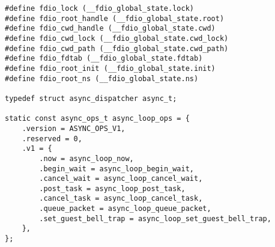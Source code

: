 \begin{verbatim}
#define fdio_lock (__fdio_global_state.lock)
#define fdio_root_handle (__fdio_global_state.root)
#define fdio_cwd_handle (__fdio_global_state.cwd)
#define fdio_cwd_lock (__fdio_global_state.cwd_lock)
#define fdio_cwd_path (__fdio_global_state.cwd_path)
#define fdio_fdtab (__fdio_global_state.fdtab)
#define fdio_root_init (__fdio_global_state.init)
#define fdio_root_ns (__fdio_global_state.ns)

typedef struct async_dispatcher async_t;

static const async_ops_t async_loop_ops = {
    .version = ASYNC_OPS_V1,
    .reserved = 0,
    .v1 = {
        .now = async_loop_now,
        .begin_wait = async_loop_begin_wait,
        .cancel_wait = async_loop_cancel_wait,
        .post_task = async_loop_post_task,
        .cancel_task = async_loop_cancel_task,
        .queue_packet = async_loop_queue_packet,
        .set_guest_bell_trap = async_loop_set_guest_bell_trap,
    },
};

\end{verbatim}